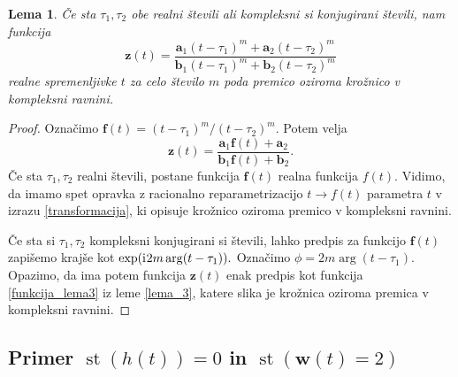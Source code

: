\documentclass[12pt,a4paper,twoside]{article}
\newcommand{\iu}{\mathrm{i}\mkern1mu} %
\theoremstyle{definition} %
\theoremstyle{plain} %
\newtheorem{lema}[definicija]{Lema}
\numberwithin{equation}{section}  %
\newcommand{\aV}{\mathbf{a}}
\newcommand{\bV}{\mathbf{b}}
\newcommand{\fV}{\mathbf{f}}
\newcommand{\wV}{\mathbf{w}}
\newcommand{\zV}{\mathbf{z}}
\DeclareMathOperator{\st}{st}
\begin{document}
\begin{lema}
	\label{lema_4}
	Če sta $\tau_1,\tau_2$ obe realni števili ali kompleksni si konjugirani števili, nam funkcija
	\begin{equation}
		\label{funkcija_lema4}
		\zV(t)=\frac{\aV_1(t-\tau_1)^m+\aV_2(t-\tau_2)^m}{\bV_1(t-\tau_1)^m+\bV_2(t-\tau_2)^m}
	\end{equation}
	realne spremenljivke $t$ za celo število $m$ poda premico oziroma krožnico v kompleksni ravnini.
\end{lema}
\begin{proof}
	Označimo $\fV(t)=(t-\tau_1)^m/(t-\tau_2)^m.$ Potem velja
	\begin{equation*}
		\zV(t)=\frac{\aV_1\fV(t)+\aV_2}{\bV_1\fV(t)+\bV_2}.
	\end{equation*}
	Če sta $\tau_1,\tau_2$ realni števili, postane funkcija $\fV(t)$ realna funkcija $f(t).$ Vidimo, da imamo spet opravka z racionalno reparametrizacijo $t\to f(t)$ parametra $t$ v izrazu \eqref{transformacija}, ki opisuje krožnico oziroma premico v kompleksni ravnini.
	
	Če sta si $\tau_1,\tau_2$ kompleksni konjugirani si števili, lahko predpis za funkcijo $\fV(t)$ zapišemo krajše kot $\exp(\iu2m\arg(t-\tau_1)).$ Označimo $\phi=2m\arg(t-\tau_1).$ Opazimo, da ima potem funkcija $\zV(t)$ enak predpis kot funkcija \eqref{funkcija_lema3} iz leme \ref{lema_3}, katere slika je krožnica oziroma premica v kompleksni ravnini.
\end{proof}

\subsection{Primer \texorpdfstring{$\st(h(t))=0$}{st(h(t))=0} in \texorpdfstring{$\st(\wV(t)=2)$}{st(w(t))=2}}
\label{locevanje_h0w2}
\end{document}
